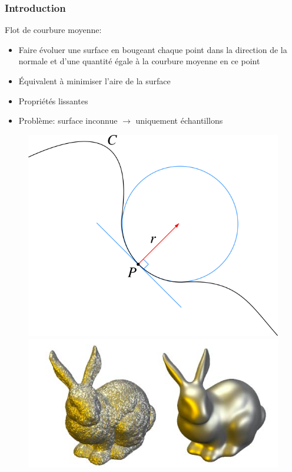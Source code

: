 \documentclass{beamer}
\begin{document}
\begin{frame}
    \frametitle{Introduction}

    Flot de courbure moyenne:
    \begin{itemize}
        \item Faire évoluer une surface en bougeant chaque point dans la
            direction de la normale et d'une quantité égale à la
            courbure moyenne en ce point
        \item Équivalent à minimiser l'aire de la surface
        \item Propriétés lissantes
        \item Problème: surface inconnue $ \to $ uniquement échantillons
    \end{itemize}

    \begin{figure}
        \centering
        \includegraphics[scale=0.25]{img/osculating-circle}
        \includegraphics[scale=0.22]{img/mean-curvature-flow-rabbit}
    \end{figure}
\end{frame}
\end{document}
